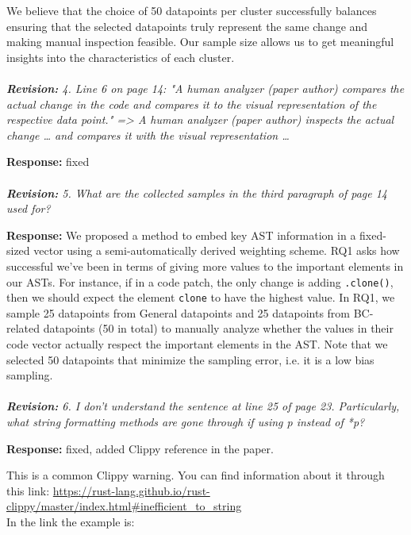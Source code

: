 \documentclass{article}
\begin{document}
We believe that the choice of 50 datapoints per cluster successfully balances ensuring that the selected datapoints truly represent the same change and making manual inspection feasible. Our sample size allows us to get meaningful insights into the characteristics of each cluster. \\ \\

\textit{\textbf{Revision:} 4. Line 6 on page 14: "A human analyzer (paper author) compares the actual change in the code and compares it to the visual representation of the respective data point." => A human analyzer (paper author) inspects the actual change … and compares it with the visual representation …}

\textbf{Response:} fixed \\ \\

\textit{\textbf{Revision:} 5. What are the collected samples in the third paragraph of page 14 used for?}

\textbf{Response:} We proposed a method to embed key AST information in a fixed-sized vector using a semi-automatically derived weighting scheme. RQ1 asks how successful we've been in terms of giving more values to the important elements in our ASTs. For instance, if in a code patch, the only change is adding \verb+.clone()+, then we should expect the element \verb+clone+ to have the highest value. In RQ1, we sample 25 datapoints from General datapoints and 25 datapoints from BC-related datapoints (50 in total) to manually analyze whether the values in their code vector actually respect the important elements in the AST. Note that we selected 50 datapoints that minimize the sampling error, i.e. it is a low bias sampling. \\ \\

\textit{\textbf{Revision:} 6. I don't understand the sentence at line 25 of page 23. Particularly, what string formatting methods are gone through if using p instead of *p?}

\textbf{Response:} fixed, added Clippy reference in the paper. 

This is a common Clippy warning. You can find information about it through this link: \url{https://rust-lang.github.io/rust-clippy/master/index.html#inefficient_to_string} \\

In the link the example is: \\
\end{document}
